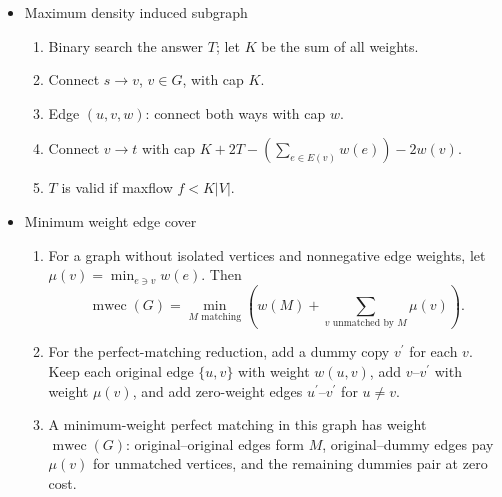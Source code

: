 \begin{itemize}
\begin{enumerate}
        \item Edge $(x, y, c)$: if $c > 0$ connect $x \rightarrow y$ with $(cost, cap) = (c, 1)$, else $y \rightarrow x$ with $(-c, 1)$.
        \item For $c < 0$ edges, sum cost as $K$, then $d(y){+}{+}$, $d(x){-}{-}$.
        \item $d(v) > 0$: connect $S \rightarrow v$ with $(0, d(v))$; $d(v) < 0$: $v \rightarrow T$ with $(0, -d(v))$.
        \item Flow $S \to T$; answer is the flow cost $C + K$.
    \end{enumerate}
    \item Maximum density induced subgraph
    \begin{enumerate}
        \itemsep-0.3em
        \item Binary search the answer $T$; let $K$ be the sum of all weights.
        \item Connect $s \rightarrow v$, $v \in G$, with cap $K$.
        \item Edge $(u, v, w)$: connect both ways with cap $w$.
        \item Connect $v \rightarrow t$ with cap $K + 2T - (\sum_{e \in E(v)}{w(e)}) - 2w(v)$.
        \item $T$ is valid if maxflow $f < K \lvert V \rvert$.
    \end{enumerate}
    \item Minimum weight edge cover
    \begin{enumerate}
        \itemsep-0.3em
      \item For a graph without isolated vertices and nonnegative edge weights, let $\mu(v)=\min_{e\ni v}w(e)$. Then
      \[\operatorname{mwec}(G)=\min_{M\text{ matching}}\left(w(M)+\sum_{v\text{ unmatched by }M}\mu(v)\right).\]
      \item For the perfect-matching reduction, add a dummy copy $v^\prime$ for each $v$. Keep each original edge $\{u,v\}$ with weight $w(u,v)$, add $v\text{--}v^\prime$ with weight $\mu(v)$, and add zero-weight edges $u^\prime\text{--}v^\prime$ for $u\ne v$.
      \item A minimum-weight perfect matching in this graph has weight $\operatorname{mwec}(G)$: original--original edges form $M$, original--dummy edges pay $\mu(v)$ for unmatched vertices, and the remaining dummies pair at zero cost.
    \end{enumerate}

\end{itemize}
